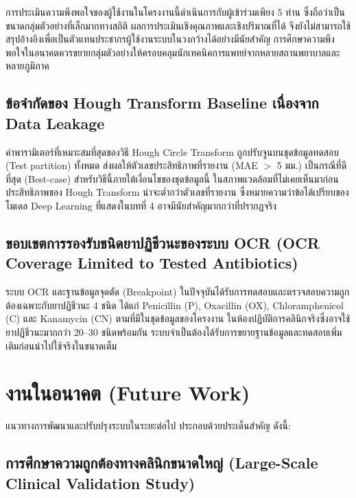 การประเมินความพึงพอใจของผู้ใช้งานในโครงงานนี้ดำเนินการกับผู้เข้าร่วมเพียง 5 ท่าน ซึ่งถือว่าเป็นขนาดกลุ่มตัวอย่างที่เล็กมากทางสถิติ ผลการประเมินเชิงคุณภาพและเชิงปริมาณที่ได้ จึงยังไม่สามารถใช้สรุปอ้างอิงเพื่อเป็นตัวแทนประชากรผู้ใช้งานระบบในวงกว้างได้อย่างมีนัยสำคัญ การศึกษาความพึงพอใจในอนาคตควรขยายกลุ่มตัวอย่างให้ครอบคลุมนักเทคนิคการแพทย์จากหลายสถานพยาบาลและหลายภูมิภาค

\subsection{ข้อจำกัดของ Hough Transform Baseline เนื่องจาก Data Leakage}

ค่าพารามิเตอร์ที่เหมาะสมที่สุดของวิธี Hough Circle Transform ถูกปรับจูนบนชุดข้อมูลทดสอบ (Test partition) ทั้งหมด ส่งผลให้ตัวเลขประสิทธิภาพที่รายงาน (MAE $>$ 5 มม.) เป็นกรณีที่ดีที่สุด (Best-case) สำหรับวิธีนี้ภายใต้เงื่อนไขของชุดข้อมูลนี้ ในสภาพแวดล้อมที่ไม่เคยเห็นมาก่อน ประสิทธิภาพของ Hough Transform น่าจะต่ำกว่าตัวเลขที่รายงาน ซึ่งหมายความว่าข้อได้เปรียบของโมเดล Deep Learning ที่แสดงในบทที่ 4 อาจมีนัยสำคัญมากกว่าที่ปรากฏจริง

\subsection{ขอบเขตการรองรับชนิดยาปฏิชีวนะของระบบ OCR (OCR Coverage Limited to Tested Antibiotics)}

ระบบ OCR และฐานข้อมูลจุดตัด (Breakpoint) ในปัจจุบันได้รับการทดสอบและตรวจสอบความถูกต้องเฉพาะกับยาปฏิชีวนะ 4 ชนิด ได้แก่ Penicillin (P), Oxacillin (OX), Chloramphenicol (C) และ Kanamycin (CN) ตามที่มีในชุดข้อมูลของโครงงาน ในห้องปฏิบัติการคลินิกจริงซึ่งอาจใช้ยาปฏิชีวนะมากกว่า 20--30 ชนิดพร้อมกัน ระบบจำเป็นต้องได้รับการขยายฐานข้อมูลและทดสอบเพิ่มเติมก่อนนำไปใช้จริงในขนาดเต็ม

\section{งานในอนาคต (Future Work)}
\label{sec:future_work}

แนวทางการพัฒนาและปรับปรุงระบบในระยะต่อไป ประกอบด้วยประเด็นสำคัญ ดังนี้:

\subsection{การศึกษาความถูกต้องทางคลินิกขนาดใหญ่ (Large-Scale Clinical Validation Study)}

